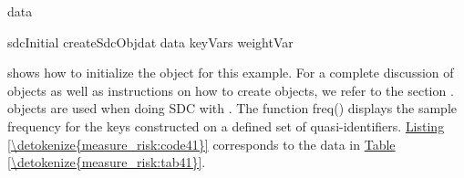 \documentclass[letterpaper,10pt,english]{sphinxmanual}
\begin{document}
\begin{footnote}[5]
\begin{sphinxVerbatim}[commandchars=\\\{\}]
                                     
                                    

data       

sdcInitial  createSdcObjdat  data keyVars      weightVar  
\end{sphinxVerbatim}
%
\end{footnote}
shows how to initialize the  object for
this example. For a complete discussion of  objects as well as
instructions on how to create  objects, we refer to
the section .
 objects are used when doing SDC with . The
function freq() displays the sample frequency for the keys constructed
on a defined set of quasi-identifiers. \hyperref[\detokenize{measure_risk:code41}]{Listing \ref{\detokenize{measure_risk:code41}}} corresponds to the
data in \hyperref[\detokenize{measure_risk:tab41}]{Table \ref{\detokenize{measure_risk:tab41}}}.
\end{document}
